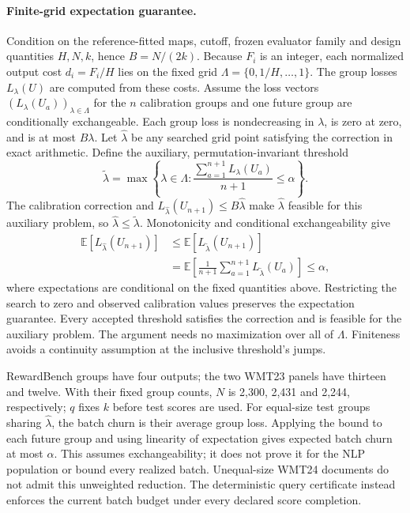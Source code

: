 \paragraph{Finite-grid expectation guarantee.}
Condition on the reference-fitted maps, cutoff, frozen evaluator family and design quantities $H,N,k$, hence $B=N/(2k)$. Because $F_i$ is an integer, each normalized output cost $d_i=F_i/H$ lies on the fixed grid $\Lambda=\{0,1/H,\ldots,1\}$. The group losses $L_\lambda(U)$ are computed from these costs. Assume the loss vectors $(L_\lambda(U_a))_{\lambda\in\Lambda}$ for the $n$ calibration groups and one future group are conditionally exchangeable. Each group loss is nondecreasing in $\lambda$, is zero at zero, and is at most $B\lambda$. Let $\hat\lambda$ be any searched grid point satisfying the correction in exact arithmetic. Define the auxiliary, permutation-invariant threshold
\[
 \tilde\lambda=\max\left\{\lambda\in\Lambda:
 \frac{\sum_{a=1}^{n+1}L_\lambda(U_a)}{n+1}\le\alpha\right\}.
\]
The calibration correction and $L_{\hat\lambda}(U_{n+1})\le B\hat\lambda$ make $\hat\lambda$ feasible for this auxiliary problem, so $\hat\lambda\le\tilde\lambda$. Monotonicity and conditional exchangeability give
\[
 \begin{aligned}
 \mathbb E[L_{\hat\lambda}(U_{n+1})]
 &\le \mathbb E[L_{\tilde\lambda}(U_{n+1})]\\
 &=\mathbb E\!\left[\frac{1}{n+1}\sum_{a=1}^{n+1}L_{\tilde\lambda}(U_a)\right]
 \le\alpha,
 \end{aligned}
\]
where expectations are conditional on the fixed quantities above. Restricting the search to zero and observed calibration values preserves the expectation guarantee. Every accepted threshold satisfies the correction and is feasible for the auxiliary problem. The argument needs no maximization over all of $\Lambda$. Finiteness avoids a continuity assumption at the inclusive threshold's jumps.

RewardBench groups have four outputs; the two WMT23 panels have thirteen and twelve. With their fixed group counts, $N$ is 2,300, 2,431 and 2,244, respectively; $q$ fixes $k$ before test scores are used. For equal-size test groups sharing $\hat\lambda$, the batch churn is their average group loss. Applying the bound to each future group and using linearity of expectation gives expected batch churn at most $\alpha$. This assumes exchangeability; it does not prove it for the NLP population or bound every realized batch. Unequal-size WMT24 documents do not admit this unweighted reduction. The deterministic query certificate instead enforces the current batch budget under every declared score completion.

